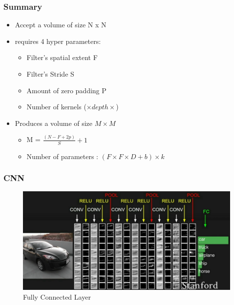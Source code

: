 \documentclass{beamer}
\begin{document}
\begin{frame}
\frametitle{Summary}
\begin{itemize}
	\item Accept a volume of size N x N 
	\item requires 4 hyper parameters:
	\begin{itemize}
		\item Filter's spatial extent F
		\item Filter's Stride S
		\item Amount of zero padding P
		\item Number of kernels ($\times depth \times$)
	\end{itemize}
	
     \item Produces a volume of size $M \times M$
     \begin{itemize}
     	\item M = $ \frac{(N - F + 2p)}{S} + 1 $
     	\item Number of parameters : $ (F \times F \times D + b) \times k $
     \end{itemize}
\end{itemize}

\end{frame}

\begin{frame}
\frametitle{CNN}

\begin{figure}
	\includegraphics[width=\linewidth]{Pics/cexample.png}
	\caption{Fully Connected Layer}
\end{figure}

\end{frame}
\end{document}
